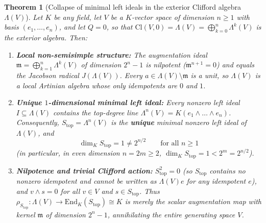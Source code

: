 \documentclass[11pt,a4paper]{article}
\theoremstyle{plain}
\newtheorem{theorem}{Theorem}[section]
\theoremstyle{definition}
\theoremstyle{remark}
\newcommand{\Cl}{\mathrm{Cl}}
\newcommand{\End}{\mathrm{End}}
\begin{document}
\begin{theorem}[Collapse of minimal left ideals in the exterior Clifford algebra $\Lambda(V)$]\label{thm:exterior}
Let $K$ be any field, let $V$ be a $K$-vector space of dimension $n \ge 1$ with basis $(e_1, \dots, e_n)$, and let $Q = 0$, so that $\Cl(V, 0) = \Lambda(V) = \bigoplus_{k=0}^n \Lambda^k(V)$ is the exterior algebra. Then:
\begin{enumerate}
  \item \textbf{Local non-semisimple structure:} The augmentation ideal $\mathfrak{m} = \bigoplus_{k=1}^n \Lambda^k(V)$ of dimension $2^n - 1$ is nilpotent ($\mathfrak{m}^{n+1} = 0$) and equals the Jacobson radical $J(\Lambda(V))$. Every $a \in \Lambda(V) \setminus \mathfrak{m}$ is a unit, so $\Lambda(V)$ is a local Artinian algebra whose only idempotents are $0$ and $1$.
  \item \textbf{Unique $1$-dimensional minimal left ideal:} Every nonzero left ideal $I \subseteq \Lambda(V)$ contains the top-degree line $\Lambda^n(V) = K(e_1 \wedge \dots \wedge e_n)$. Consequently, $S_{\mathrm{top}} = \Lambda^n(V)$ is the \textbf{unique} minimal nonzero left ideal of $\Lambda(V)$, and
  \[
    \dim_K S_{\mathrm{top}} = 1 \neq 2^{n/2} \qquad \text{for all } n \ge 1
  \]
  (in particular, in even dimension $n = 2m \ge 2$, $\dim_K S_{\mathrm{top}} = 1 < 2^m = 2^{n/2}$).
  \item \textbf{Nilpotence and trivial Clifford action:} $S_{\mathrm{top}}^2 = 0$ (so $S_{\mathrm{top}}$ contains no nonzero idempotent and cannot be written as $\Lambda(V) e$ for any idempotent $e$), and $v \wedge s = 0$ for all $v \in V$ and $s \in S_{\mathrm{top}}$. Thus $\rho_{S_{\mathrm{top}}} : \Lambda(V) \to \End_K(S_{\mathrm{top}}) \cong K$ is merely the scalar augmentation map with kernel $\mathfrak{m}$ of dimension $2^n - 1$, annihilating the entire generating space $V$.
\end{enumerate}
\end{theorem}
\end{document}
